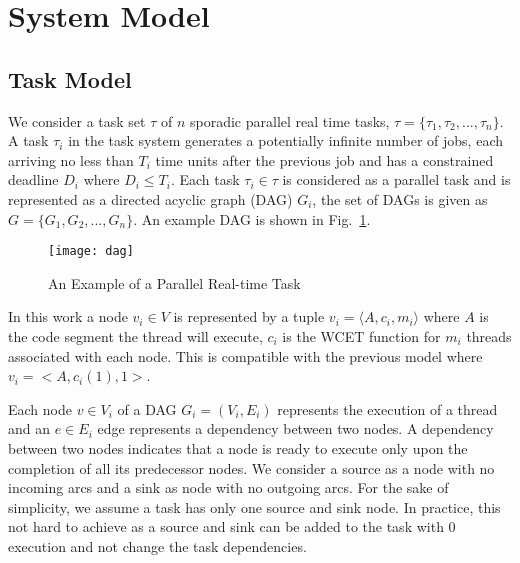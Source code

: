 \section{System Model}

\subsection{Task Model}
We consider a task set $\tau$ of ${n}$ sporadic parallel real time tasks,
$\tau = \{\tau_1,\tau_2, ..., \tau_n\}$. A task $\tau_i$ in the task
system generates a potentially infinite number of jobs, each arriving
no less than $T_i$ time units after the previous job and has a constrained
deadline $D_i$ where $D_i \leq T_i$.  Each task $\tau_i \in \tau$ is
considered as a parallel task and is represented as a directed acyclic
graph (DAG) ${G_i}$, the set of DAGs is given as ${G = \{G_1, G_2,
  ..., G_n\}}$. An example DAG is shown in Fig.~\ref{fig:dag}.

\begin{figure}[!h]
  \centering
  \texttt{[image: dag]}
  \caption{An Example of a Parallel Real-time Task}
  \label{fig:dag}
\end{figure}


In this work a node ${v_i \in V}$ is represented by a tuple
${v_i = \langle A, c_i, m_i \rangle }$ where ${A}$ is the code segment
the thread will execute, ${c_i}$ is the WCET function for ${m_i}$
threads associated with each node.  This is compatible with the previous model
 where ${v_i = <A, c_i(1), 1>}$. 

Each node ${v \in V_i}$ of a DAG ${G_i = (V_i, E_i)}$ represents the
execution of a thread and an ${e \in E_i}$ edge represents a
dependency between two nodes. A dependency between two nodes indicates
that a node is ready to execute only upon the completion of all its
predecessor nodes. We consider a source as a node with no incoming
arcs and a sink as node with no outgoing arcs. For the sake of
simplicity, we assume a task has only one source and sink node. In
practice, this not hard to achieve as a source and sink can be added
to the task with $0$ execution and not change the task dependencies.

